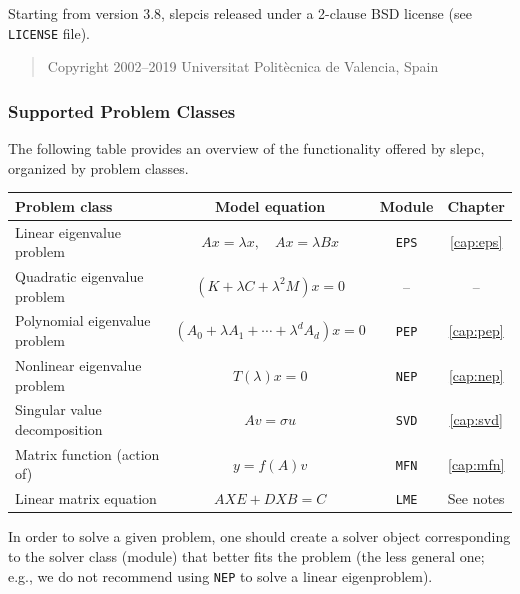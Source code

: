 \documentclass[titlepage,10pt,a4paper]{book}
\newcommand{\packnoi}[1]{{\sc #1}\xspace}
\newcommand{\slepc}{\texorpdfstring{\packnoi{slep\rm c}}{{SLEPc}}}
\begin{document}
{Starting from version 3.8, \slepc is released under a 2-clause BSD license (see \texttt{LICENSE} file).

\begin{quote}
\begin{sffamily}
Copyright 2002--2019 Universitat Polit\`ecnica de Valencia, Spain
\end{sffamily}
\end{quote}

\newpage
\subsubsection*{Supported Problem Classes}

The following table provides an overview of the functionality offered by \slepc, organized by problem classes.

\begin{table}[h]
\label{tab:modules}
\centering
{\small \begin{tabular}{lccc}
Problem class                 & Model equation  & Module       & Chapter \\\hline
Linear eigenvalue problem     & $Ax=\lambda x,\quad Ax=\lambda Bx$ & \texttt{EPS} & \ref{cap:eps} \\
Quadratic eigenvalue problem  & $(K+\lambda C+\lambda^2M)x=0$ & -- & -- \\
Polynomial eigenvalue problem & $(A_0+\lambda A_1+\cdots+\lambda^dA_d)x=0$ & \texttt{PEP} & \ref{cap:pep} \\
Nonlinear eigenvalue problem  & $T(\lambda)x=0$ & \texttt{NEP} & \ref{cap:nep} \\\hline
Singular value decomposition  & $Av=\sigma u$   & \texttt{SVD} & \ref{cap:svd} \\
Matrix function (action of)   & $y=f(A)v$   & \texttt{MFN} & \ref{cap:mfn} \\
Linear matrix equation        & $AXE+DXB=C$   & \texttt{LME} & See notes \\\hline
\end{tabular} }
\end{table}

\noindent In order to solve a given problem, one should create a solver object corresponding to the solver class (module) that better fits the problem (the less general one; e.g., we do not recommend using \texttt{NEP} to solve a linear eigenproblem).\\[3mm]

}
\end{document}
